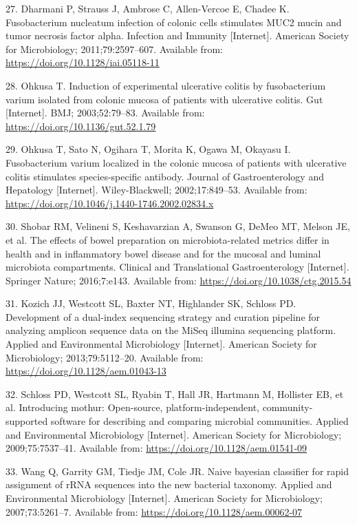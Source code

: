\documentclass[12pt,]{article}
\begin{document}
\hypertarget{ref-Dharmani2011}{}
27. Dharmani P, Strauss J, Ambrose C, Allen-Vercoe E, Chadee K.
Fusobacterium nucleatum infection of colonic cells stimulates MUC2 mucin
and tumor necrosis factor alpha. Infection and Immunity {[}Internet{]}.
American Society for Microbiology; 2011;79:2597--607. Available from:
\url{https://doi.org/10.1128/iai.05118-11}

\hypertarget{ref-Ohkusa2003}{}
28. Ohkusa T. Induction of experimental ulcerative colitis by
fusobacterium varium isolated from colonic mucosa of patients with
ulcerative colitis. Gut {[}Internet{]}. BMJ; 2003;52:79--83. Available
from: \url{https://doi.org/10.1136/gut.52.1.79}

\hypertarget{ref-Ohkusa2002}{}
29. Ohkusa T, Sato N, Ogihara T, Morita K, Ogawa M, Okayasu I.
Fusobacterium varium localized in the colonic mucosa of patients with
ulcerative colitis stimulates species-specific antibody. Journal of
Gastroenterology and Hepatology {[}Internet{]}. Wiley-Blackwell;
2002;17:849--53. Available from:
\url{https://doi.org/10.1046/j.1440-1746.2002.02834.x}

\hypertarget{ref-Shobar2016}{}
30. Shobar RM, Velineni S, Keshavarzian A, Swanson G, DeMeo MT, Melson
JE, et al. The effects of bowel preparation on microbiota-related
metrics differ in health and in inflammatory bowel disease and for the
mucosal and luminal microbiota compartments. Clinical and Translational
Gastroenterology {[}Internet{]}. Springer Nature; 2016;7:e143. Available
from: \url{https://doi.org/10.1038/ctg.2015.54}

\hypertarget{ref-Kozich2013}{}
31. Kozich JJ, Westcott SL, Baxter NT, Highlander SK, Schloss PD.
Development of a dual-index sequencing strategy and curation pipeline
for analyzing amplicon sequence data on the MiSeq illumina sequencing
platform. Applied and Environmental Microbiology {[}Internet{]}.
American Society for Microbiology; 2013;79:5112--20. Available from:
\url{https://doi.org/10.1128/aem.01043-13}

\hypertarget{ref-Schloss2009}{}
32. Schloss PD, Westcott SL, Ryabin T, Hall JR, Hartmann M, Hollister
EB, et al. Introducing mothur: Open-source, platform-independent,
community-supported software for describing and comparing microbial
communities. Applied and Environmental Microbiology {[}Internet{]}.
American Society for Microbiology; 2009;75:7537--41. Available from:
\url{https://doi.org/10.1128/aem.01541-09}

\hypertarget{ref-Wang2007}{}
33. Wang Q, Garrity GM, Tiedje JM, Cole JR. Naive bayesian classifier
for rapid assignment of rRNA sequences into the new bacterial taxonomy.
Applied and Environmental Microbiology {[}Internet{]}. American Society
for Microbiology; 2007;73:5261--7. Available from:
\url{https://doi.org/10.1128/aem.00062-07}
\end{document}
